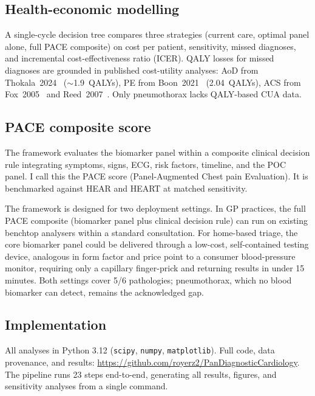 \documentclass[11pt, oneside]{article}
\begin{document}
\subsection{Health-economic modelling}

A single-cycle decision tree compares three strategies (current care, optimal panel alone, full PACE composite) on cost per patient, sensitivity, missed diagnoses, and incremental cost-effectiveness ratio (ICER). QALY losses for missed diagnoses are grounded in published cost-utility analyses: AoD from Thokala~2024~\cite{Thokala2024AAS} ($\sim$1.9~QALYs), PE from Boon~2021~\cite{Boon2021CTEPH} (2.04~QALYs), ACS from Fox~2005~\cite{Fox2005} and Reed~2007~\cite{Reed2007}. Only pneumothorax lacks QALY-based CUA data.

\subsection{PACE composite score}

The framework evaluates the biomarker panel within a composite clinical decision rule integrating symptoms, signs, ECG, risk factors, timeline, and the POC panel. I call this the PACE score (Panel-Augmented Chest pain Evaluation). It is benchmarked against HEAR and HEART at matched sensitivity.

The framework is designed for two deployment settings. In GP practices, the full PACE composite (biomarker panel plus clinical decision rule) can run on existing benchtop analysers within a standard consultation. For home-based triage, the core biomarker panel could be delivered through a low-cost, self-contained testing device, analogous in form factor and price point to a consumer blood-pressure monitor, requiring only a capillary finger-prick and returning results in under 15 minutes. Both settings cover 5/6 pathologies; pneumothorax, which no blood biomarker can detect, remains the acknowledged gap.

\subsection{Implementation}

All analyses in Python 3.12 (\texttt{scipy}, \texttt{numpy}, \texttt{matplotlib}). Full code, data provenance, and results: \url{https://github.com/royerz2/PanDiagnosticCardiology}. The pipeline runs 23 steps end-to-end, generating all results, figures, and sensitivity analyses from a single command.


\end{document}
